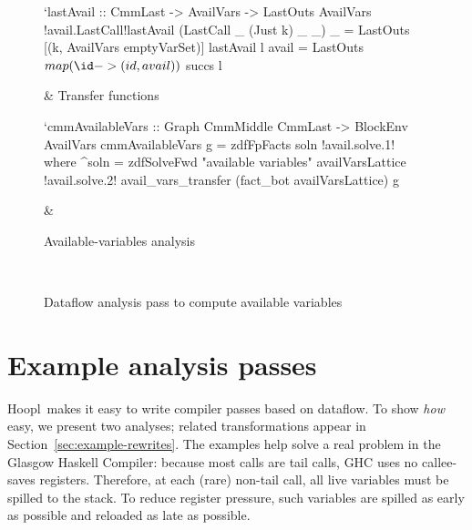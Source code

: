 \documentclass[blockstyle,preprint,natbib,nocopyrightspace]{sigplanconf}
\newcommand\ourlib{Hoopl}  %
\def\baselinestretch{0.8}\tiny
\def\baselinestretch{0.8}\tiny
\newcommand\secref[1]{Section~\ref{sec:#1}}
\newcommand\seclabel[1]{\label{sec:#1}}
\newcommand\figlabel[1]{\label{fig:#1}}
\begin{document}
\begin{figure*}
\begin{codetable}
\begin{code}
`lastAvail :: CmmLast -> AvailVars -> LastOuts AvailVars
!avail.LastCall!lastAvail (LastCall _ (Just k) _ _) _ = LastOuts [(k, AvailVars emptyVarSet)]
lastAvail l avail = LastOuts $ map (\id -> (id, avail)) $ succs l
\end{code}
\B
& \mbox{\phantom{SPACE}}
\mbox{\phantom{XXXX}Transfer} \mbox{\phantom{XXXX}functions}\\
\hline

\T
\begin{code}
`cmmAvailableVars :: Graph CmmMiddle CmmLast -> BlockEnv AvailVars
cmmAvailableVars g = zdfFpFacts soln
!avail.solve.1!  where ^soln = zdfSolveFwd "available variables" availVarsLattice 
!avail.solve.2!                 avail_vars_transfer (fact_bot availVarsLattice) g
\end{code}
\B
& %
\def\baselinestretch{0.8}\hspace{-0.3in}\parbox{1.6in}{\center Available-variables analysis}
\\

\end{codetable}
\caption{Dataflow analysis pass to compute available variables}
\figlabel{avail-all}
\figlabel{avail}
\figlabel{avail-lattice}
\figlabel{avail-gen-kill}
\figlabel{avail-transfers}
\figlabel{avail-running}
\end{figure*}

\section{Example analysis passes}

\seclabel{example-analyses}


\ourlib\
makes it easy to write compiler passes based on dataflow.
To show \emph{how} easy, we present
two analyses;
related transformations appear in \secref{example-rewrites}. 
The examples help solve a real problem in the Glasgow Haskell
Compiler:
because most calls are tail calls, GHC uses no 
callee-saves registers.
Therefore, at each (rare) non-tail call, all live
variables must be spilled to the stack.
\ifcutting\else
To reduce register pressure,
such variables are spilled as early as possible and reloaded as late as
possible. 
\fi
\end{document}
